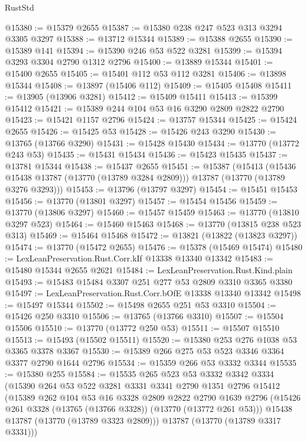 \begin{lexlean}{RustStd}
\begin{coremodule}
@15380 := @15379 @2655
@15387 := @15380 @238 @247 @523 @313 @3294 @3305 @3297
@15388 := @13712 @15344
@15389 := @15388 @2655
@15390 := @15389 @141
@15394 := @15390 @246 @53 @522 @3281
@15399 := @15394 @3293 @3304 @2790 @1312 @2796
@15400 := @13889 @15344
@15401 := @15400 @2655
@15405 := @15401 @112 @53 @112 @3281
@15406 := @13898 @15344
@15408 := @13897 (@15406 @112)
@15409 := @15405 @15408
@15411 := @13905 (@13906 @3281)
@15412 := @15409 @15411
@15413 := @15399 @15412
@15421 := @15389 @244 @104 @53 @16 @3290 @2809 @2822 @2790
@15423 := @15421 @1157 @2796
@15424 := @13757 @15344
@15425 := @15424 @2655
@15426 := @15425 @53
@15428 := @15426 @243 @3290
@15430 := @13765 (@13766 @3290)
@15431 := @15428 @15430
@15434 := @13770 (@13772 @243 @53)
@15435 := @15431 @15434
@15436 := @15423 @15435
@15437 := @13781 @15344
@15438 := @15437 @2655
@15451 := @15387
    (@15413
      (@15436 @15438 @13787 (@13770 (@13789 @3284 @2809)))
      @13787
      (@13770 (@13789 @3276 @3293)))
@15453 := @13796 (@13797 @3297)
@15454 := @15451 @15453
@15456 := @13770 (@13801 @3297)
@15457 := @15454 @15456
@15459 := @13770 (@13806 @3297)
@15460 := @15457 @15459
@15463 := @13770 (@13810 @3297 @523)
@15464 := @15460 @15463
@15468 := @13770 (@13815 @238 @523 @313)
@15469 := @15464 @15468
@15472 := @13821 (@13822 (@13823 @3297))
@15474 := @13770 (@15472 @2655)
@15476 := @15378 (@15469 @15474)
@15480 := LexLeanPreservation.Rust.Corr.kIf @13338 @13340 @13342
@15483 := @15480 @15344 @2655 @2621
@15484 := LexLeanPreservation.Rust.Kind.plain
@15493 := @15483 @15484 @3307 @251 @277 @53 @2809 @3310 @3365 @3380
@15497 := LexLeanPreservation.Rust.Corr.bOfE @13338 @13340 @13342
@15498 := @15497 @15344
@15502 := @15498 @2655 @251 @53 @3310
@15504 := @15426 @250 @3310
@15506 := @13765 (@13766 @3310)
@15507 := @15504 @15506
@15510 := @13770 (@13772 @250 @53)
@15511 := @15507 @15510
@15513 := @15493 (@15502 @15511)
@15520 := @15380 @253 @276 @1038 @53 @3365 @3378 @3367
@15530 := @15389 @266 @275 @53 @523 @3346 @3364 @3377 @2790 @1644 @2796
@15534 := @15359 @266 @53 @3332 @3344
@15535 := @15380 @255
@15584 := @15535
    @265
    @523
    @53
    @3332
    @3342
    @3334
    (@15390
      @264
      @53
      @522
      @3281
      @3331
      @3341
      @2790
      @1351
      @2796
      @15412
      (@15389
        @262
        @104
        @53
        @16
        @3328
        @2809
        @2822
        @2790
        @1639
        @2796
        (@15426 @261 @3328 (@13765 (@13766 @3328)) (@13770 (@13772 @261 @53)))
        @15438
        @13787
        (@13770 (@13789 @3323 @2809)))
      @13787
      (@13770 (@13789 @3317 @3331)))

\end{coremodule}
\end{lexlean}
